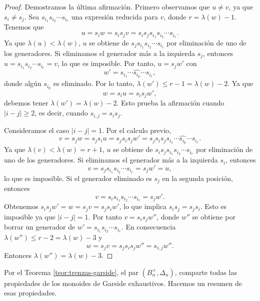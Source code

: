 \documentclass[12pt]{book}
\theoremstyle{definition}
\begin{document}
\begin{proof}
Demostramos la última afirmación. Primero observamos que $u\neq v$, ya que $s_i\neq s_j$. Sea $s_{i_1}s_{i_2}\cdots s_{i_r}$ una expresión reducida para $v$, donde $r=\lambda(w)-1$. Tenemos que
$$u=s_iw=s_is_jv=s_is_js_{i_1}s_{i_2}\cdots s_{i_r}.$$
Ya que $\lambda(u)<\lambda(w)$, $u$ se obtiene de $s_js_{i_1}s_{i_2}\cdots s_{i_r}$ por eliminación de uno de los generadores. Si eliminamos el generador más a la izquierda $s_j$, entonces $u=s_{i_1}s_{i_2}\cdots s_{i_r}=v$, lo que es imposible. Por tanto, $u=s_jw'$ con
$$w'=s_{i_1}\cdots\widehat{s_{i_p}}\cdots s_{i_r},$$
donde algún $s_{i_p}$ es eliminado. Por lo tanto, $\lambda(w')\leq r-1=\lambda(w)-2$. Ya que
$$w=s_iu=s_is_jw',$$
debemos tener $\lambda(w')=\lambda(w)-2$. Esto prueba la afirmación cuando $|i-j|\geq 2$, es decir, cuando $s_{i,j}=s_is_j$.

Consideramos el caso $|i-j|=1$. Por el calculo previo,
$$v=s_jw=s_js_iu=s_js_is_jw'=s_js_is_js_{i_1}\cdots\widehat{s_{i_p}}\cdots s_{i_r}.$$
Ya que $\lambda(v)<\lambda(w)=r+1$, $u$ se obtiene de $s_is_js_{i_1}s_{i_2}\cdots s_{i_r}$ por eliminación de uno de los generadores. Si eliminamos el generador más a la izquierda $s_i$, entonces
$$v=s_js_{i_1}s_{i_2}\cdots s_{i_r}=s_jw'=u,$$
lo que es imposible. Si el generador eliminado es $s_j$ en la segunda posición, entonces
$$v=s_is_{i_1}s_{i_2}\cdots s_{i_r}=s_jw'.$$
Obtenemos $s_is_jw'=w=s_jv=s_js_iw'$, lo que implica $s_is_j=s_js_i$. Esto es imposible ya que $|i-j|=1$. Por tanto $v=s_is_jw''$, donde $w''$ se obtiene por borrar un generador de $w'=s_{i_1}s_{i_2}\cdots s_{i_r}$. En consecuencia $\lambda(w'')\leq r-2=\lambda(w)-3$ y
$$w=s_jv=s_js_is_jw''=s_{i,j}w''.$$
Entonces $\lambda(w'')=\lambda(w)-3$.
\end{proof}
Por el Teorema \ref{teor:trenzas-garside}, el par $(B_n^+,\Delta_n)$, comparte todas las propiedades de los monoides de Garside exhaustivos. Hacemos un resumen de esas propiedades.
\end{document}
